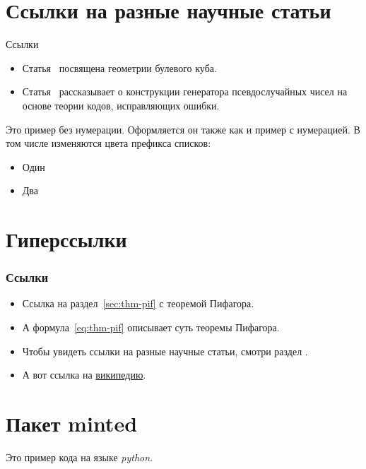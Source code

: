 \documentclass[nooutline]{../cmcbeamer}
\begin{document}
\section{Ссылки на разные научные статьи}\label{sec:ref-to-articles}

\begin{frame}{Ссылки}
  \begin{example}\label{ex:example:refs}
    \begin{itemize}
    \item Статья~\cite{ahlswede1977} посвящена геометрии булевого
      куба.
    \item Статья~\cite{ahmed2013} рассказывает о конструкции
      генератора псевдослучайных чисел на основе теории кодов,
      исправляющих ошибки.
    \end{itemize}
  \end{example}

  \begin{example*}
    Это пример без нумерации.
    Оформляется он также как и пример с нумерацией.
    В том числе изменяются цвета префикса списков:

    \begin{itemize}
    \item Один
    \item Два
    \end{itemize}
  \end{example*}
\end{frame}


\section{Гиперссылки}\label{sec:hyper}

\begin{frame}
  \frametitle{Ссылки}

  \begin{itemize}
  \item<1-> Ссылка на раздел~\ref{sec:thm-pif} с теоремой Пифагора.
  \item<2-> А формула~\eqref{eq:thm-pif} описывает суть теоремы
    Пифагора.
  \item<3-> Чтобы увидеть ссылки на разные научные статьи, смотри
    раздел \hyperref[sec:ref-to-articles]{}.
  \item<2-> А вот ссылка на
    \href{https://ru.wikipedia.org}{википедию}.
  \end{itemize}
\end{frame}

\if \MINTED\empty
\else
\section{Пакет minted}\label{sec:minted}

\begin{example}\label{ex:example:minted}
  Это пример кода на языке \emph{python}.
  \inputminted{python}{code.py}
\end{example}
\fi
\end{document}
